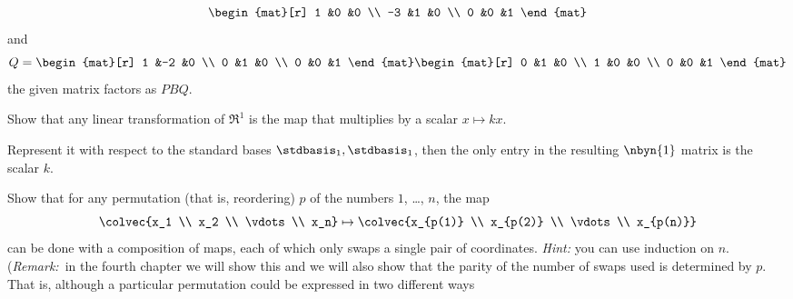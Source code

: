 \begin{exercises}
\begin{answer}
\begin{equation*}
\begin{mat}[r]
          1  &0  &0  \\
         -3  &1  &0  \\
          0  &0  &1         
        \end{mat}
      \end{equation*}
      and 
      \begin{equation*}
        Q=
        \begin{mat}[r]
          1  &-2    &0  \\
          0  &1     &0  \\
          0  &0     &1         
        \end{mat}
        \begin{mat}[r]
          0  &1     &0  \\
          1  &0     &0  \\
          0  &0     &1         
        \end{mat}
      \end{equation*}
      the given matrix factors as $PBQ$.
    \end{answer}
  \item \label{exer:RToRIsScalMult} 
    Show that any linear transformation of $\Re^1$ is the map
    that multiplies by a scalar $x\mapsto kx$.
    \begin{answer}
      Represent it with respect to the 
      standard bases $\stdbasis_1,\stdbasis_1$, then the
      only entry in the resulting $\nbyn{1}$ matrix is the scalar $k$.
    \end{answer}
  \item \label{exer:PermIsCompSwaps}
    Show that for any permutation  
    (that is, reordering) $p$ of the numbers
    $1$, \ldots, $n$, the map 
    \begin{equation*}
      \colvec{x_1 \\ x_2 \\ \vdots\\ x_n}
      \mapsto
      \colvec{x_{p(1)} \\ x_{p(2)} \\ \vdots \\ x_{p(n)}}
    \end{equation*}
    can be done with a composition of maps, 
    each of which only swaps a single pair of coordinates.
    \textit{Hint:} you can use induction on $n$.
    (\textit{Remark:}~in the fourth chapter we will show this and we will also 
    show that the parity of the number of swaps used is determined by $p$.
    That is, although a particular
    permutation could be expressed in two different ways

\end{exercises}
